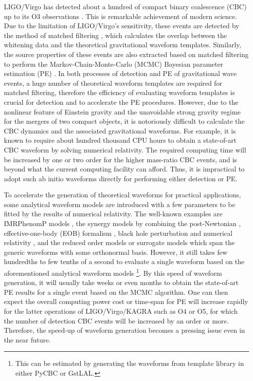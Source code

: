 \documentclass[twocolumn,prd,superscriptaddress,nofootinbib]{revtex4-1}
\begin{document}
LIGO/Virgo has detected about a hundred of compact binary coalescence (CBC) up to its O3 observations \cite{Abbott:2016blz,LIGOScientific:2018mvr,Abbott:2020niy}. This is remarkable achievement of modern science. Due to the limitation of LIGO/Virgo's sensitivity, these events are detected by the method of matched filtering \cite{schutz_1991,Owen_1996,Owen_1999}, which calculates the overlap between the whitening data and the theoretical gravitational waveform templates.  Similarly, the source properties of these events are also extracted based on matched filtering to perform the  Markov-Chain-Monte-Carlo (MCMC) Bayesian parameter estimation (PE) \cite{veitch2015parameter,biwer2019pycbc}. In both processes of detection and PE of gravitational wave events, a huge number of theoretical waveform templates are required for matched filtering, therefore the efficiency of evaluating waveform templates is crucial for detection and to accelerate the PE procedures. However, due to the nonlinear feature of Einstein gravity and the unavoidable strong gravity regime for the mergers of two compact objects, it is notoriously difficult to calculate the CBC dynamics and the associated gravitational waveforms. For example, it is known \cite{Hinder:2010vn,Pfeiffer_2012} to require about hundred thousand CPU hours to obtain a state-of-art CBC waveform by solving numerical relativity. The required computing time will be increased by one or two order for the higher mass-ratio CBC events, and is beyond what the current computing facility can afford. Thus, it is impractical to adopt such ab initio waveforms directly for performing either detection or PE. 



To accelerate the generation of theoretical waveforms for practical applications, some analytical waveform models are introduced with a few parameters to be fitted by the results of numerical relativity. The well-known examples are IMRPhenomP models \cite{Hannam:2013oca,Khan:2018fmp}, the synergy models \cite{Buonanno_2007,Pan_2011,Ajith_2011} by combining the post-Newtonian \cite{Einstein:1938yz,Blanchet:2013haa},  effective-one-body (EOB) formalism \cite{PhysRevD.59.084006,Buonanno_2000}, black hole perturbation \cite{Kokkotas_1999,Nollert:1999ji} and numerical relativity \cite{Centrella:2010mx,Loffler:2011ay}, and the reduced order models or surrogate models \cite{Blackman_2015,P_rrer_2016,Williams_2020} which span the generic waveforms with some orthonormal basis. 
However, it still takes few hundredths to few tenths of a second to evaluate a single waveform based on  the aforementioned analytical waveform models \footnote{This can be estimated by generating the waveforms from template library in either PyCBC or GstLAL.}.  By this speed of waveform generation, it will usually take weeks or even months to obtain the state-of-art PE results for a single event based on the MCMC algorithm. One can then expect the overall computing power cost or time-span for PE will increase rapidly for the latter operations of LIGO/Virgo/KAGRA such as O4 or O5, for which the number of detection CBC events will be increased by an order or more. Therefore, the speed-up of waveform generation becomes a pressing issue even in the near future. 
\end{document}
